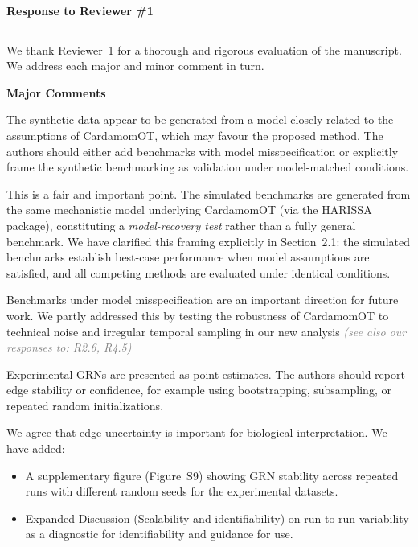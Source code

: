 \documentclass[11pt,a4paper]{article}
\newcounter{revtotal}   %
\newcounter{revlocal}   %
\newcommand{\currentreviewer}{}  %
\newcommand{\newreviewer}[1]{%
  \setcounter{revlocal}{0}%
  \renewcommand{\currentreviewer}{#1}%
}
\newcommand{\revcomment}[2]{%
  \stepcounter{revtotal}%
  \stepcounter{revlocal}%
  \edef\commentlabel{\currentreviewer.\arabic{revlocal}}%
  \begin{tcolorbox}[revstyle,
      title={\commentlabel\ $|$\ #1}]
    #2
  \end{tcolorbox}%
  \edef\lastcommentlabel{\commentlabel}%
}
\newcommand{\response}[1]{%
  \begin{tcolorbox}[respstyle,
      title={Response to \lastcommentlabel}]
    #1
  \end{tcolorbox}%
}
\newcommand{\seealso}[1]{\textit{\textcolor{gray}{(see also our responses to: #1)}}}
\renewcommand{\section}[1]{%
  \vspace{1.2em}%
  {\large\bfseries\color{secpurple} #1}\\[-0.4em]%
  {\color{secpurple}\rule{\linewidth}{0.8pt}}%
  \vspace{0.4em}%
}
\newcommand{\subsect}[1]{%
  \vspace{0.8em}%
  {\normalsize\bfseries\color{revblue} #1}%
  \vspace{0.3em}\par%
}
\begin{document}
\section{Response to Reviewer \#1}

\newreviewer{R1}

We thank Reviewer~1 for a thorough and rigorous evaluation of the manuscript.
We address each major and minor comment in turn.

\subsect{Major Comments}

\revcomment{Benchmark fairness should be clarified}{%
The synthetic data appear to be generated from a model closely related to the assumptions
of CardamomOT, which may favour the proposed method. The authors should either add
benchmarks with model misspecification or explicitly frame the synthetic benchmarking as
validation under model-matched conditions.}
\response{%
This is a fair and important point. The simulated benchmarks are generated from the same
mechanistic model underlying CardamomOT (via the HARISSA package), constituting a
\textit{model-recovery test} rather than a fully general benchmark. We have clarified this
framing explicitly in Section~2.1: the simulated benchmarks establish
best-case performance when model assumptions are satisfied, and all competing methods are
evaluated under identical conditions.

Benchmarks under model misspecification are an important direction for future work. We partly addressed this by testing the robustness of CardamomOT to technical noise and irregular temporal sampling in our new analysis \seealso{R2.6, R4.5}}

\revcomment{Uncertainty in inferred GRNs should be reported}{%
Experimental GRNs are presented as point estimates. The authors should report edge
stability or confidence, for example using bootstrapping, subsampling, or repeated random
initializations.}
\response{%
We agree that edge uncertainty is important for biological interpretation. We have added:
\begin{itemize}
  \item A supplementary figure (Figure~S9) showing GRN stability across repeated runs with different random seeds for the experimental datasets.
  \item Expanded Discussion (Scalability and identifiability) on run-to-run variability as a diagnostic for identifiability and guidance for use.
\end{itemize}}
\end{document}
